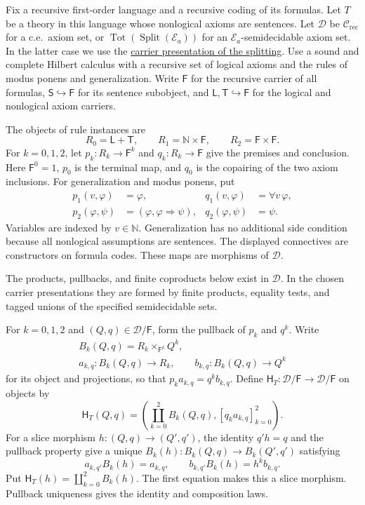 \documentclass[11pt]{article}
\newcommand{\N}{\mathbb N}
\begin{document}
Fix a recursive first-order language and a recursive coding of its
formulas. Let $T$ be a theory in this language whose nonlogical axioms
are sentences. Let
$\mathcal D$ be $\mathcal C_{\mathrm{rec}}$ for a c.e.\ axiom set,
or $\operatorname{Tot}(\operatorname{Split}(\mathcal E_a))$ for an
$\mathcal E_a$-semidecidable axiom set. In the latter case we use the
\hyperref[def:miller-splitting]{carrier presentation of the splitting}.
Use a sound and complete
Hilbert calculus with a recursive set of logical axioms and the rules
of modus ponens and generalization.
Write $\mathsf F$ for the recursive carrier of all formulas,
$\mathsf S\hookrightarrow\mathsf F$ for its sentence subobject, and
$\mathsf L,\mathsf T\hookrightarrow\mathsf F$ for the logical and
nonlogical axiom carriers.

The objects of rule instances are
\[
 R_0=\mathsf L+\mathsf T,\qquad
 R_1=\N\times\mathsf F,\qquad R_2=\mathsf F\times\mathsf F.
\]
For $k=0,1,2$, let $p_k:R_k\to\mathsf F^k$ and
$q_k:R_k\to\mathsf F$ give the premises and conclusion. Here
$\mathsf F^0=1$, $p_0$ is the terminal map, and $q_0$ is the copairing
of the two axiom inclusions. For generalization and modus ponens, put
\[
\begin{aligned}
 p_1(v,\varphi)&=\varphi,&
 q_1(v,\varphi)&=\forall v\,\varphi,\\
 p_2(\varphi,\psi)&=(\varphi,\varphi\Rightarrow\psi),&
 q_2(\varphi,\psi)&=\psi.
\end{aligned}
\]
Variables are indexed by $v\in\N$. Generalization has no additional
side condition because all nonlogical assumptions are sentences.
The displayed connectives are constructors on formula codes.
These maps are morphisms of $\mathcal D$.

The products, pullbacks, and finite coproducts below exist in
$\mathcal D$. In the chosen carrier presentations they are formed
by finite products, equality tests, and tagged unions of the specified
semidecidable sets.

For $k=0,1,2$ and $(Q,q)\in\mathcal D/\mathsf F$, form the pullback
of $p_k$ and $q^k$. Write
\[
\begin{gathered}
 B_k(Q,q)=R_k\times_{\mathsf F^k}Q^k,
 \\
 a_{k,q}:B_k(Q,q)\to R_k,\qquad
 b_{k,q}:B_k(Q,q)\to Q^k
\end{gathered}
\]
for its object and projections, so that
$p_ka_{k,q}=q^kb_{k,q}$.
Define $\mathsf H_T:\mathcal D/\mathsf F\to\mathcal D/\mathsf F$
on objects by
\[
 \mathsf H_T(Q,q)=
 \left(\coprod_{k=0}^2 B_k(Q,q),
       [q_ka_{k,q}]_{k=0}^2\right).
\]
For a slice morphism $h:(Q,q)\to(Q',q')$, the identity $q'h=q$
and the pullback property give a unique
$B_k(h):B_k(Q,q)\to B_k(Q',q')$ satisfying
\[
 a_{k,q'}B_k(h)=a_{k,q},\qquad
 b_{k,q'}B_k(h)=h^kb_{k,q}.
\]
Put $\mathsf H_T(h)=\coprod_{k=0}^2 B_k(h)$.
The first equation makes this a slice morphism. Pullback uniqueness
gives the identity and composition laws.
\end{document}
